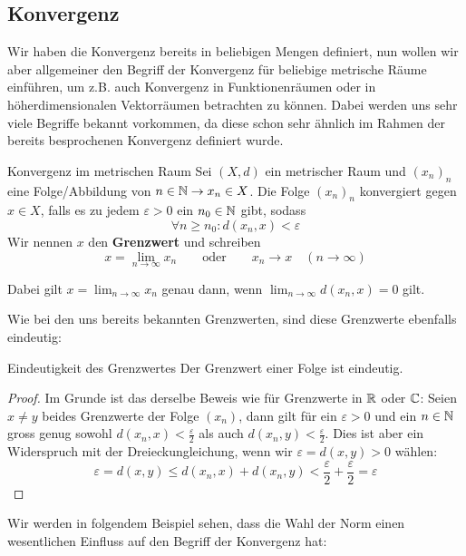 \subsection{Konvergenz}
Wir haben die Konvergenz bereits in beliebigen Mengen definiert, nun wollen wir aber allgemeiner den Begriff der Konvergenz für beliebige metrische Räume einführen, um z.B. auch Konvergenz in Funktionenräumen oder in höherdimensionalen Vektorräumen betrachten zu können. Dabei werden uns sehr viele Begriffe bekannt vorkommen, da diese schon sehr ähnlich im Rahmen der bereits besprochenen Konvergenz definiert wurde.

\begin{definition}{Konvergenz im metrischen Raum}{}
Sei $(X, d)$ ein metrischer Raum und $(x_n)_n$ eine Folge/Abbildung von $n \in \mathbb{N} \to x_n \in X$. Die Folge $(x_n)_n$ konvergiert gegen $x \in X$, falls es zu jedem $\varepsilon > 0$ ein $n_0 \in \mathbb{N}$ gibt, sodass
$$\forall n \geq n_0: d(x_n,x) < \varepsilon$$
Wir nennen $x$ den \textbf{Grenzwert} und schreiben
$$x = \lim_{n \to \infty} x_n \qquad \text{oder} \qquad x_n \to x \quad (n \to \infty)$$
\end{definition}

\begin{remark}
Dabei gilt $x = \lim_{n \to \infty}x_n$ genau dann, wenn $\lim_{n \to \infty} d(x_n,x) = 0$ gilt.
\end{remark}

Wie bei den uns bereits bekannten Grenzwerten, sind diese Grenzwerte ebenfalls eindeutig:
\begin{lemma}{Eindeutigkeit des Grenzwertes}{}
Der Grenzwert einer Folge ist eindeutig.
\end{lemma}

\begin{proof}
Im Grunde ist das derselbe Beweis wie für Grenzwerte in $\mathbb{R}$ oder $\mathbb{C}$: Seien $x\neq y$ beides Grenzwerte der Folge $(x_n)$, dann gilt für ein $\varepsilon > 0$ und ein $n \in \mathbb{N}$ gross genug sowohl $d(x_n,x) < \frac{\varepsilon}{2}$ als auch $d(x_n,y) < \frac{\varepsilon}{2}$. Dies ist aber ein Widerspruch mit der Dreieckungleichung, wenn wir $\varepsilon = d(x,y) > 0$ wählen:
$$\varepsilon = d(x,y) \leq d(x_n, x) + d(x_n, y) < \frac{\varepsilon}{2} + \frac{\varepsilon}{2} = \varepsilon$$
\end{proof}

Wir werden in folgendem Beispiel sehen, dass die Wahl der Norm einen wesentlichen Einfluss auf den Begriff der Konvergenz hat:

